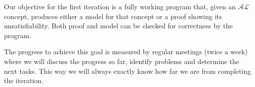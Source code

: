 
Our objective for the first iteration is a fully working program that, given an
$\mathcal{AL}$ concept, produces either a model for that concept or a proof showing its
unsatisfiability. Both proof and model can be checked for correctness by the program.

The progress to achieve this goal is measured by regular meetings (twice a week) where
we will discuss the progress so far, identify problems and determine the next tasks. This
way we will always exactly know how far we are from completing the iteration.

